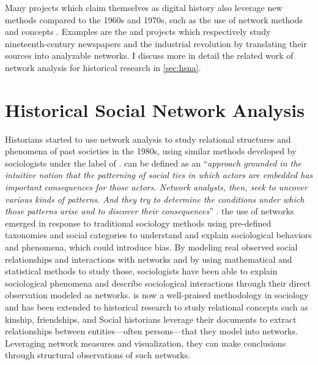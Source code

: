 Many projects which claim themselves as digital history also leverage new methods compared to the 1960s and 1970s, such as the use of network methods and concepts \cite{ahnertNetworkTurnChanging2020}.
Examples are the \cite{cordell2017viral} and  \cite{ardanuyLivingMachinesStudy2020} projects which respectively study nineteenth-century newspapers and the industrial revolution by translating their sources into analyzable networks.
I discuss more in detail the related work of network analysis for historical research in \autoref{sec:hsna}.


\section{Historical Social Network Analysis}\label{sec:hsna}

Historians started to use network analysis to study relational structures and phenomena of past societies in the 1980s, using similar methods developed by sociologists under the label of \sna.
\sna can be defined as an ``\textit{approach grounded in the intuitive notion that the patterning of social ties in which actors are embedded has important consequences for those actors. Network analysts, then, seek to uncover various kinds of patterns. And they try to determine the conditions under which those patterns arise and to discover their consequences}'' \cite{freemanDevelopmentSocialNetwork2004}.
the use of networks emerged in response to traditional sociology methods using pre-defined taxonomies and social categories to understand and explain sociological behaviors and phenomena, which could introduce bias\cite{scottSocialNetworkAnalysis1988}.
By modeling real observed social relationships and interactions with networks and by using mathematical and statistical methods to study those, sociologists have been able to explain sociological phenomena and describe sociological interactions through their direct observation modeled as networks.
\sna is now a well-praised methodology in sociology and has been extended to historical research to study relational concepts such as kinship, friendships, and 
Social historians leverage their documents to extract relationships between entities---often persons---that they model into networks.
Leveraging network measures and visualization, they can make conclusions through structural observations of such networks.


